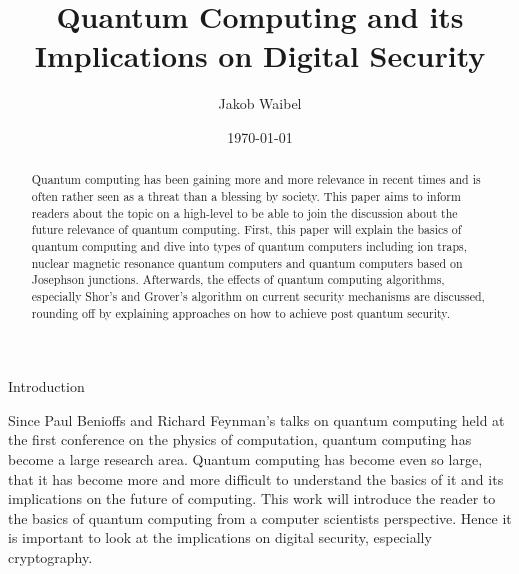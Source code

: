 \documentclass[aps,preprintnumbers,twocolumn]{revtex4}
\begin{document}
\title{Quantum Computing and its Implications on Digital Security}
\author{Jakob Waibel}


\date{\today}

\begin{abstract}
Quantum computing has been gaining more and more relevance in recent times and is often rather seen as a threat than a blessing by society. This paper aims to inform readers about the topic on a high-level to be able to join the discussion about the future relevance of quantum computing. First, this paper will explain the basics of quantum computing and dive into types of quantum computers including ion traps, nuclear magnetic resonance quantum computers and quantum computers based on Josephson junctions. Afterwards, the effects of quantum computing algorithms, especially Shor's and Grover's algorithm on current security mechanisms are discussed, rounding off by explaining approaches on how to achieve post quantum security.
\end{abstract}

\maketitle

\begin{section}{Introduction}
    
Since Paul Benioffs and Richard Feynman's talks on quantum computing held at the first conference on the physics of computation, 
quantum computing has become a large research area. 
Quantum computing has become even so large, that it has become more and more difficult to understand the basics of it and its implications on the future of computing. 
This work will introduce the reader to the basics of quantum computing from a computer scientists perspective. 
Hence it is important to look at the implications on digital security, especially cryptography.

\end{section}
\end{document}
